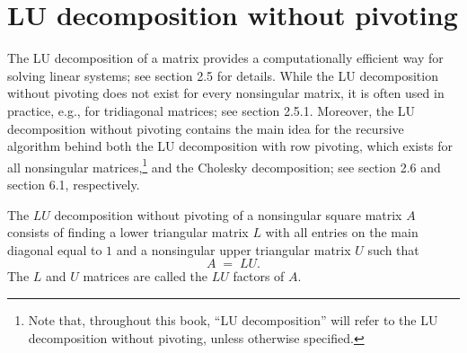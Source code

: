 
\begin{table}[H]
\centering
\caption{Backward Substitution for upper triangular bidiagonal matrices}
\end{table}

\section{LU decomposition without pivoting}

The LU decomposition of a matrix provides a computationally efficient
way for solving linear systems; see section 2.5 for details. While the
LU decomposition without pivoting does not exist for every nonsingular
matrix, it is often used in practice, e.g., for tridiagonal matrices;
see section 2.5.1. Moreover, the LU decomposition without pivoting
contains the main idea for the recursive algorithm behind both the LU
decomposition with row pivoting, which exists for all nonsingular
matrices,\footnote{Note that, throughout this book, ``LU decomposition''
will refer to the LU decomposition without pivoting, unless otherwise
specified.} and the Cholesky decomposition; see section 2.6 and
section 6.1, respectively.

\begin{definition}
The $LU$ decomposition without pivoting of a nonsingular square matrix
$A$ consists of finding a lower triangular matrix $L$ with all entries
on the main diagonal equal to $1$ and a nonsingular upper triangular
matrix $U$ such that
\[
A \;=\; LU.
\]
The $L$ and $U$ matrices are called the $LU$ factors of $A$.
\end{definition}

